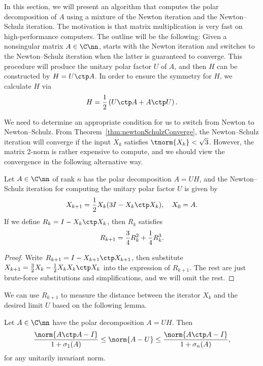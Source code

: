 \documentclass{article}
\numberwithin{equation}{section} %
\newcommand{\gnorm}[1]{\norm{#1}}
\begin{document}
In this section, we will present an algorithm that computes the polar
decomposition of $A$ using a mixture of the Newton iteration and the
Newton--Schulz iteration. The motivation is that matrix multiplication is
very fast on high-performance computers. The outline will be the following:
Given a nonsingular matrix $A\in\C\nn$, starts with the Newton iteration
and switches to the Newton--Schulz iteration when the latter is guaranteed
to converge. This procedure will produce the unitary polar factor $U$ of
$A$, and then $H$ can be constructed by $H = U\ctp A$. In order to ensure
the symmetry for $H$, we calculate $H$ via
\begin{equation}
  \notag 
  H = \frac{1}{2}\left(U\ctp A + A\ctp U\right).
\end{equation}

We need to determine an appropriate condition for us to switch from Newton
to Newton--Schulz. From Theorem~\ref{thm:newtonSchulzConverge}, the
Newton--Schulz iteration will converge if the input $X_k$ satisfies
$\tnorm{X_k} < \sqrt{3}$. However, the matrix 2-norm is rather expensive to
compute, and we should view the convergence in the following alternative
way.

\begin{theorem}
\label{thm:Conv-in-R}
Let $A\in\C\nn$ of rank $n$ has the polar decomposition $A=UH$, and the
Newton--Schulz iteration for computing the unitary polar factor $U$ is
given by
\begin{equation}
  \notag 
  X_{k+1} = \frac{1}{2}X_k(3I - X_k\ctp X_k), \quad X_0 = A.
\end{equation}
If we define $R_k = I - X_k\ctp X_k$, then $R_k$ satisfies
\begin{equation}
  \notag
  R_{k+1} = \frac{3}{4}R_k^2 + \frac{1}{4}R_k^3.
\end{equation}
\end{theorem}

\begin{proof}
Write $R_{k+1} = I - X_{k+1}\ctp X_{k+1}$, then substitute
$X_{k+1} = \frac{3}{2} X_k - \frac{1}{2}X_kX_k\ctp X_k$ into the expression
of $R_{k+1}$. The rest are just brute-force substitutions and
simplifications, and we will omit the rest.
\end{proof}

We can use $R_{k+1}$ to measure the distance between the iterator $X_k$ and
the desired limit $U$ based on the following lemma.

\begin{lemma}
Let $A\in\C\nn$ have the polar decomposition $A=UH$. Then
\begin{equation}
  \label{eq:DistEquiv} 
  \frac{\gnorm{A\ctp A - I}}{1+\sigma_1(A)} \leq \gnorm{A-U} \leq 
  \frac{\gnorm{A\ctp A - I}}{1+\sigma_n(A)},
\end{equation}
for any unitarily invariant norm.
\end{lemma}
\end{document}
